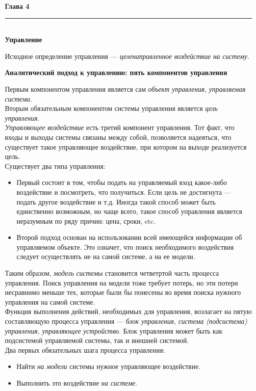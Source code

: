 \documentclass{article}
\newcommand{\note}[1]{\textit{#1}}
\renewcommand{\section}[2]{
	\vspace{6em}
	\begin{flushright}
	\Large
	\baselineskip=0.5\baselineskip
	\textbf{#1}
	\\
	\rule[0.5\baselineskip]{\textwidth}{0.15pt}
	\\
	\textbf{#2}
	\end{flushright}
	}
\renewcommand{\subsection}[1]{
	\vspace{2em}
	\begin{flushright}
		\large
		\textbf{#1}
	\end{flushright}
	}
\begin{document}
\section{Глава 4}{Управление}
Исходное определение управления --- \note{целенаправленное воздействие на систему}.
\subsection{Аналитический подход к управлению: пять компонентов управления}
Первым компонентом управления является сам \note{объект управления, управляемая система}.\\
Вторым обязательным компонентом системы управления является \note{цель управления}.\\
\note{Управляющее воздействие} есть третий компонент управления. Тот факт, что входы и выходы системы связаны между собой, позволяется надеяться, что существует такое управляющее воздействие, при котором на выходе реализуется цель.\\
Существует два типа управления:
\begin{itemize}
	\item Первый состоит в том, чтобы подать на управляемый вход какое-либо воздействие и посмотреть, что получиться. Если цель не достигнута --- подать другое воздействие и т.д. Иногда такой способ может быть единственно возможным, но чаще всего, такое способ управления является неразумным по ряду причин: цена, сроки, etc.
	\item Второй подход основан на использовании всей имеющейся информации об управляемом объекте. Это означет, что поиск необходимого воздействия следует осуществлять не на самой системе, а на ее модели.
\end{itemize}
Таким образом, \note{модель системы} становится четветртой часть процесса управления. Поиск управления на модели тоже требует потерь, но эти потери несравнимо меньше тех, которые были бы понесены во время поиска нужного управления на самой системе.\\
Функция выполнения действий, необходимых для управления, возлагает на пятую составляющую процесса управления --- \note{блок управления, система (подсистема) управления, управляющее устройство}. Блок управления может быть как подсистемой управляемой системы, так и внешней системой.\\
Два первых обязательных шага процесса управления:
\begin{itemize}
	\item Найти \note{на модели} системы нужное управляющее воздействие.
	\item Выполнить это воздействие \note{на системе}.
\end{itemize}
\end{document}
